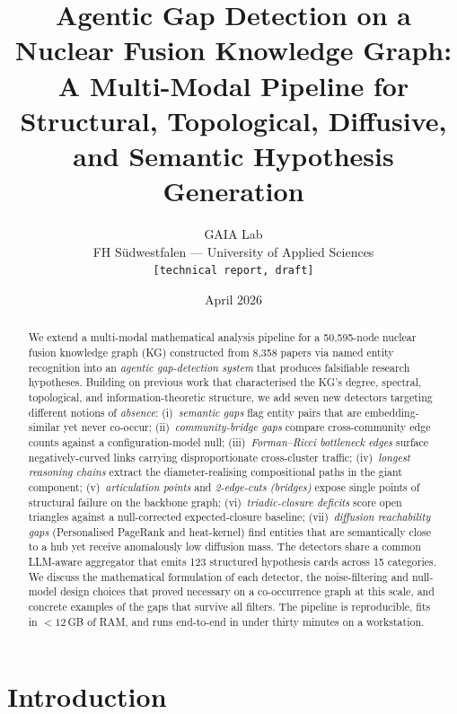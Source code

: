 \documentclass[11pt,a4paper]{article}
\title{%
  Agentic Gap Detection on a Nuclear Fusion Knowledge Graph:\\
  A Multi-Modal Pipeline for Structural, Topological, Diffusive,\\
  and Semantic Hypothesis Generation%
}
\author{%
  GAIA Lab\\
  FH S\"udwestfalen --- University of Applied Sciences\\
  \texttt{[technical report, draft]}%
}
\date{April 2026}
\begin{document}
\maketitle

\begin{abstract}
We extend a multi-modal mathematical analysis pipeline for a 50{,}595-node nuclear fusion knowledge graph (KG) constructed from 8{,}358 papers via named entity recognition into an \emph{agentic gap-detection system} that produces falsifiable research hypotheses. Building on previous work that characterised the KG's degree, spectral, topological, and information-theoretic structure, we add seven new detectors targeting different notions of \emph{absence}: (i)~\emph{semantic gaps} flag entity pairs that are embedding-similar yet never co-occur; (ii)~\emph{community-bridge gaps} compare cross-community edge counts against a configuration-model null; (iii)~\emph{Forman--Ricci bottleneck edges} surface negatively-curved links carrying disproportionate cross-cluster traffic; (iv)~\emph{longest reasoning chains} extract the diameter-realising compositional paths in the giant component; (v)~\emph{articulation points} and \emph{2-edge-cuts (bridges)} expose single points of structural failure on the backbone graph; (vi)~\emph{triadic-closure deficits} score open triangles against a null-corrected expected-closure baseline; (vii)~\emph{diffusion reachability gaps} (Personalised PageRank and heat-kernel) find entities that are semantically close to a hub yet receive anomalously low diffusion mass. The detectors share a common LLM-aware aggregator that emits 123 structured hypothesis cards across 15 categories. We discuss the mathematical formulation of each detector, the noise-filtering and null-model design choices that proved necessary on a co-occurrence graph at this scale, and concrete examples of the gaps that survive all filters. The pipeline is reproducible, fits in $<\!12$\,GB of RAM, and runs end-to-end in under thirty minutes on a workstation.
\end{abstract}

\tableofcontents
\bigskip

\section{Introduction}
\label{sec:intro}
\end{document}
